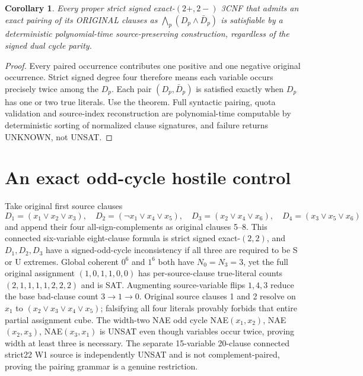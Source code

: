 \documentclass[10pt]{article}
\newtheorem{corollary}{Corollary}
\begin{document}
\begin{corollary}
Every proper strict signed exact-$(2+,2-)$ 3CNF that admits an exact pairing of its ORIGINAL clauses as $\bigwedge_p(D_p\land\bar D_p)$ is satisfiable by a deterministic polynomial-time source-preserving construction, regardless of the signed dual cycle parity.
\end{corollary}
\begin{proof}
Every paired occurrence contributes one positive and one negative original occurrence. Strict signed degree four therefore means each variable occurs precisely twice among the $D_p$. Each pair $(D_p,\bar D_p)$ is satisfied exactly when $D_p$ has one or two true literals. Use the theorem. Full syntactic pairing, quota validation and source-index reconstruction are polynomial-time computable by deterministic sorting of normalized clause signatures, and failure returns UNKNOWN, not UNSAT.
\end{proof}
\section{An exact odd-cycle hostile control}
Take original first source clauses
\[
D_1=(x_1\vee x_2\vee x_3),\quad
D_2=(\neg x_1\vee x_4\vee x_5),\quad
D_3=(x_2\vee x_4\vee x_6),\quad
D_4=(x_3\vee x_5\vee x_6)
\]
and append their four all-sign-complements as original clauses 5--8. This connected six-variable eight-clause formula is strict signed exact-$(2,2)$, and $D_1,D_2,D_3$ have a signed-odd-cycle inconsistency if all three are required to be S or U extremes. Global coherent $0^6$ and $1^6$ both have $N_0=N_3=3$, yet the full original assignment $(1,0,1,1,0,0)$ has per-source-clause true-literal counts $(2,1,1,1,1,2,2,2)$ and is SAT. Augmenting source-variable flips $1,4,3$ reduce the base bad-clause count $3\to1\to0$. Original source clauses 1 and 2 resolve on $x_1$ to $(x_2\vee x_3\vee x_4\vee x_5)$; falsifying all four literals provably forbids that entire partial assignment cube.
The width-two NAE odd cycle NAE$(x_1,x_2)$, NAE$(x_2,x_3)$, NAE$(x_3,x_1)$ is UNSAT even though variables occur twice, proving width at least three is necessary. The separate 15-variable 20-clause connected strict22 W1 source is independently UNSAT and is not complement-paired, proving the pairing grammar is a genuine restriction.
\end{document}
